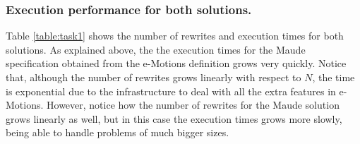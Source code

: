 \subsubsection{Execution performance for both solutions.}

Table \ref{table:task1} shows the number of rewrites and execution times for both solutions. As explained above, the the execution times for the Maude specification obtained from the e-Motions definition grows very quickly. Notice that, although the number of rewrites grows linearly with respect to $N$, the time is exponential due to the infrastructure to deal with all the extra features in e-Motions. However, notice how the number of rewrites for the Maude solution grows linearly as well, but in this case the execution times grows more slowly, being able to handle problems of much bigger sizes.

